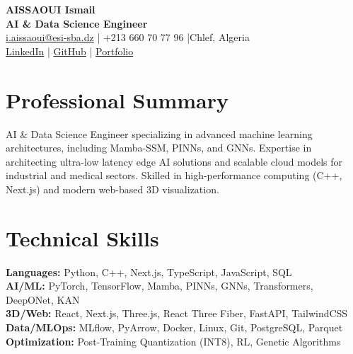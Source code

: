 \documentclass[a4paper,10pt]{article}
\begin{document}
\sloppy

\begin{center}
    {\Huge\bfseries\color{titleblue} AISSAOUI Ismail}\\[1pt]
    {\LARGE\bfseries AI \& Data Science Engineer}\\[2pt]
    {    \href{mailto:i.aissaoui@esi-sba.dz}{i.aissaoui@esi-sba.dz} \quad|\quad
    +213 660 70 77 96 \quad|\quad Chlef, Algeria \\[1pt]
    \href{https://linkedin.com/in/aissaoui-ismail-6a77a92a7}{LinkedIn} \quad|\quad
    \href{https://github.com/i-aissaoui}{GitHub} \quad|\quad
    \href{https://ismail-aissaoui.vercel.app}{Portfolio}
    }
\end{center}

\section{Professional Summary}
AI \& Data Science Engineer specializing in advanced machine learning architectures, including Mamba-SSM, PINNs, and GNNs. Expertise in architecting ultra-low latency edge AI solutions and scalable cloud models for industrial and medical sectors. Skilled in high-performance computing (C++, Next.js) and modern web-based 3D visualization.

\section{Technical Skills}
\textbf{Languages:} Python, C++, Next.js, TypeScript, JavaScript, SQL \\
\textbf{AI/ML:} PyTorch, TensorFlow, Mamba, PINNs, GNNs, Transformers, DeepONet, KAN \\
\textbf{3D/Web:} React, Next.js, Three.js, React Three Fiber, FastAPI, TailwindCSS \\
\textbf{Data/MLOps:} MLflow, PyArrow, Docker, Linux, Git, PostgreSQL, Parquet \\
\textbf{Optimization:} Post-Training Quantization (INT8), RL, Genetic Algorithms
\end{document}
